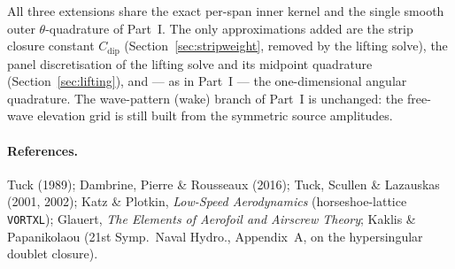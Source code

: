 \documentclass[11pt]{article}
\begin{document}
\noindent All three extensions share the exact per-span inner kernel and the
single smooth outer $\theta$-quadrature of Part~I. The only approximations added
are the strip closure constant $C_{\mathrm{dip}}$ (Section~\ref{sec:stripweight},
removed by the lifting solve), the panel discretisation of the lifting solve and
its midpoint quadrature (Section~\ref{sec:lifting}), and --- as in Part~I --- the
one-dimensional angular quadrature. The wave-pattern (wake) branch of Part~I is
unchanged: the free-wave elevation grid is still built from the symmetric source
amplitudes.

\paragraph{References.} Tuck (1989); Dambrine, Pierre \& Rousseaux (2016);
Tuck, Scullen \& Lazauskas (2001, 2002); Katz \& Plotkin, \emph{Low-Speed
Aerodynamics} (horseshoe-lattice \texttt{VORTXL}); Glauert, \emph{The Elements of
Aerofoil and Airscrew Theory}; Kaklis \& Papanikolaou (21st Symp.\ Naval Hydro.,
Appendix~A, on the hypersingular doublet closure).
\end{document}
